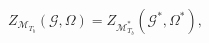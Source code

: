 \begin{equation}
Z_{\mathcal{M}_{T_{b}}}(\mathcal{G},\Omega )=Z_{\mathcal{M}_{T_{b}}^{\ast }}(%
\mathcal{G}^{\ast },\Omega ^{\ast }),  \label{43}
\end{equation}

